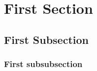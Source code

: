 \section{First Section}

\lipsum[1-2]        %

\subsection{First Subsection}

\lipsum[3-5]        %

\subsubsection{First subsubsection}

\lipsum[6]          %
